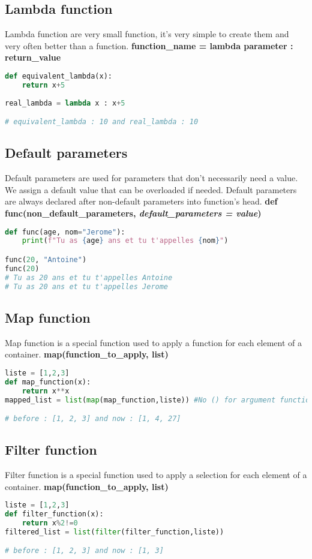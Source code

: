 \documentclass[a4paper, 12pt]{article}
\begin{document}
\subsection{Lambda function}
\label{subsec:Lambda}
Lambda function are very small function, it's very simple to create them and very often better than a function. \textbf{function\_name = lambda parameter : return\_value}
\begin{lstlisting}[language=Python]
def equivalent_lambda(x):
	return x+5
	
real_lambda = lambda x : x+5

# equivalent_lambda : 10 and real_lambda : 10
\end{lstlisting}

\subsection{Default parameters}
Default parameters are used for parameters that don't necessarily need a value. We assign a default value that can be overloaded if needed. Default parameters are always declared after non-default parameters into function's head. \textbf{def func(non\_default\_parameters, \textit{default\_parameters = value})}

\begin{lstlisting}[language=Python]
def func(age, nom="Jerome"):
	print(f"Tu as {age} ans et tu t'appelles {nom}")

func(20, "Antoine")
func(20)
# Tu as 20 ans et tu t'appelles Antoine
# Tu as 20 ans et tu t'appelles Jerome

\end{lstlisting}

\subsection{Map function}
Map function is a special function used to apply a function for each element of a container. \textbf{map(function\_to\_apply, list)}
\begin{lstlisting}[language=Python]
liste = [1,2,3]
def map_function(x):
	return x**x
mapped_list = list(map(map_function,liste)) #No () for argument function

# before : [1, 2, 3] and now : [1, 4, 27]
\end{lstlisting}

\subsection{Filter function}
Filter function is a special function used to apply a selection for each element of a container. \textbf{map(function\_to\_apply, list)}
\begin{lstlisting}[language=Python]
liste = [1,2,3]
def filter_function(x):
	return x%2!=0
filtered_list = list(filter(filter_function,liste))

# before : [1, 2, 3] and now : [1, 3]
\end{lstlisting}
\end{document}
